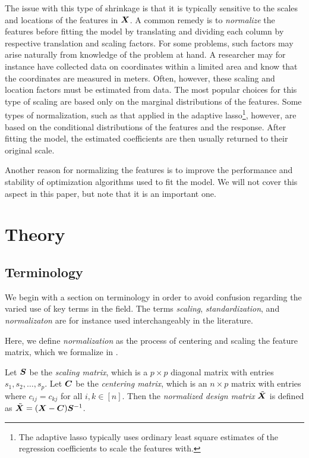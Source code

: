 
The issue with this type of shrinkage is that it is typically sensitive to the scales and locations of the features in \(\mat X\).
A common remedy is to \emph{normalize} the features before fitting the model by translating and dividing each column by respective translation and scaling factors.
For some problems, such factors may arise naturally from knowledge of the problem at hand.
A researcher may for instance have collected data on coordinates within a limited area and know that the coordinates are measured in meters.
Often, however, these scaling and location factors must be estimated from data.
The most popular choices for this type of scaling are based only on the marginal distributions of the features.
Some types of normalization, such as that applied in the adaptive lasso\footnote{The adaptive lasso typically uses ordinary least square estimates of the regression coefficients to scale the features with.}, however, are based on the conditional distributions of the features and the response.
After fitting the model, the estimated coefficients are then usually returned to their original scale.

Another reason for normalizing the features is to improve the performance and stability of optimization algorithms used to fit the model.
We will not cover this aspect in this paper, but note that it is an important one.

\section{Theory}

\subsection{Terminology}

We begin with a section on terminology in order to avoid confusion regarding the varied use of key terms in the field. The terms \emph{scaling}, \emph{standardization}, and \emph{normalizaton} are for instance used interchangeably in the literature.

Here, we define \emph{normalization} as the process of centering and scaling the feature matrix, which we formalize in .

\begin{definition}[Normalization]
  \label{def:normalization}
  Let \(\mat S\) be the \emph{scaling matrix}, which is a \(p \times p\) diagonal matrix with entries \(s_1, s_2, \dots, s_p\). Let \(\mat C\) be the \emph{centering matrix}, which is an \(n \times p\) matrix with entries where \(c_{ij} = c_{kj}\) for all \(i,k \in [n]\). Then the \emph{normalized design matrix} \(\tilde{\mat X}\) is defined as \(\tilde{\mat X} = (\mat X - \mat C)\mat S^{-1}\).
\end{definition}


